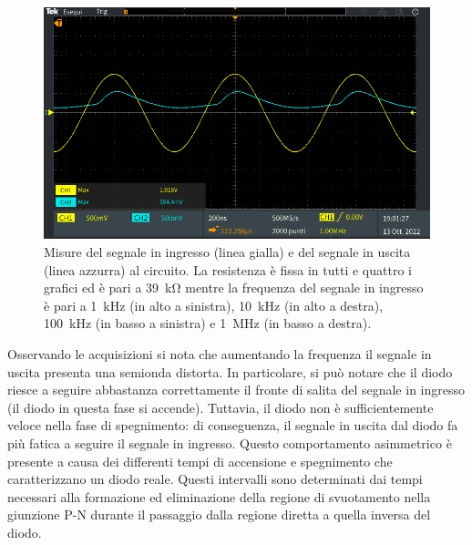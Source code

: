 \begin{figure}[tbh]
\begin{minipage}{.496\textwidth}
	\end{minipage}
	\begin{minipage}{.496\textwidth}
		\includegraphics[width=\linewidth]{./ImageFiles/Laboratorio 2/TEK00014.PNG}
	\end{minipage}
	\caption{Misure del segnale in ingresso (linea gialla) e del segnale in uscita (linea azzurra) al circuito. La resistenza è fissa in tutti e quattro i grafici ed è pari a \SI{39}{\kilo\ohm} mentre la frequenza del segnale in ingresso è pari a \SI{1}{\kilo\hertz} (in alto a sinistra), \SI{10}{\kilo\hertz} (in alto a destra), \SI{100}{\kilo\hertz} (in basso a sinistra) e \SI{1}{\mega\hertz} (in basso a destra).}
	\label{fig:freqwith38}
\end{figure}
Osservando le acquisizioni si nota che aumentando la frequenza il segnale in uscita presenta una semionda distorta. In particolare, si può notare che il diodo riesce a seguire abbastanza correttamente il fronte di salita del segnale in ingresso (il diodo in questa fase si accende). Tuttavia, il diodo non è sufficientemente veloce nella fase di spegnimento: di conseguenza, il segnale in uscita dal diodo fa più fatica a seguire il segnale in ingresso. Questo comportamento asimmetrico è presente a causa dei differenti tempi di accensione e spegnimento che caratterizzano un diodo reale. Questi intervalli sono determinati dai tempi necessari alla formazione ed eliminazione della regione di svuotamento nella giunzione P-N durante il passaggio dalla regione diretta a quella inversa del diodo.  

\clearpage

